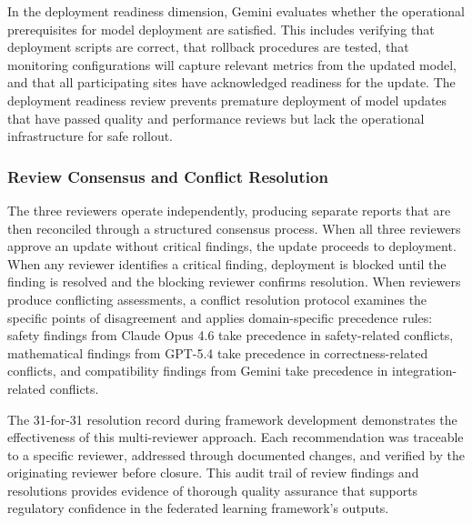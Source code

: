 In the deployment readiness dimension, Gemini evaluates whether the operational
prerequisites for model deployment are satisfied. This includes verifying that
deployment scripts are correct, that rollback procedures are tested, that
monitoring configurations will capture relevant metrics from the updated model,
and that all participating sites have acknowledged readiness for the update.
The deployment readiness review prevents premature deployment of model updates
that have passed quality and performance reviews but lack the operational
infrastructure for safe rollout.

\subsubsection{Review Consensus and Conflict Resolution}

The three reviewers operate independently, producing separate reports that are
then reconciled through a structured consensus process. When all three
reviewers approve an update without critical findings, the update proceeds to
deployment. When any reviewer identifies a critical finding, deployment is
blocked until the finding is resolved and the blocking reviewer confirms
resolution. When reviewers produce conflicting assessments, a conflict
resolution protocol examines the specific points of disagreement and applies
domain-specific precedence rules: safety findings from Claude Opus 4.6 take
precedence in safety-related conflicts, mathematical findings from GPT-5.4
take precedence in correctness-related conflicts, and compatibility findings
from Gemini take precedence in integration-related conflicts.

The 31-for-31 resolution record during framework development demonstrates the
effectiveness of this multi-reviewer approach. Each recommendation was
traceable to a specific reviewer, addressed through documented changes, and
verified by the originating reviewer before closure. This audit trail of review
findings and resolutions provides evidence of thorough quality assurance that
supports regulatory confidence in the federated learning framework's outputs.
